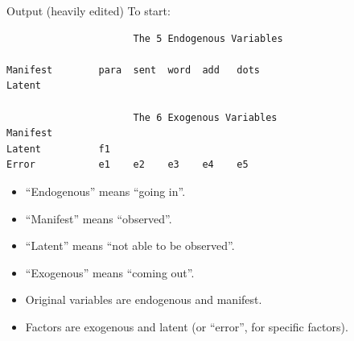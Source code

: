 \documentclass[pdf]{prosper}
\begin{document}
  \begin{slide}{Output (heavily edited)}
    To start:

{\scriptsize
\begin{verbatim}
                      The 5 Endogenous Variables

Manifest        para  sent  word  add   dots                          
Latent                                                                

                      The 6 Exogenous Variables
Manifest                                                              
Latent          f1    
Error           e1    e2    e3    e4    e5                            

\end{verbatim}
}

\begin{itemize}
\item ``Endogenous'' means ``going in''.
\item ``Manifest'' means ``observed''.
\item ``Latent'' means ``not able to be observed''.
\item ``Exogenous'' means ``coming out''.
\item Original variables are endogenous and manifest.
\item Factors are exogenous and latent (or ``error'', for specific factors).
\end{itemize}

  \end{slide}
\end{document}
